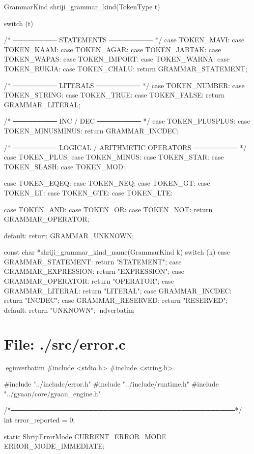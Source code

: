 \documentclass{article}
\begin{document}
GrammarKind shriji_grammar_kind(TokenType t)
{
    switch (t) {

        /* ───────── STATEMENTS ───────── */
        case TOKEN_MAVI:
        case TOKEN_KAAM:
        case TOKEN_AGAR:
        case TOKEN_JABTAK:
        case TOKEN_WAPAS:
        case TOKEN_IMPORT:
        case TOKEN_WARNA:
        case TOKEN_RUKJA:
        case TOKEN_CHALU:
            return GRAMMAR_STATEMENT;

        /* ───────── LITERALS ───────── */
        case TOKEN_NUMBER:
        case TOKEN_STRING:
        case TOKEN_TRUE:
        case TOKEN_FALSE:
            return GRAMMAR_LITERAL;

        /* ───────── INC / DEC ───────── */
        case TOKEN_PLUSPLUS:
        case TOKEN_MINUSMINUS:
            return GRAMMAR_INCDEC;

        /* ───────── LOGICAL / ARITHMETIC OPERATORS ───────── */
        case TOKEN_PLUS:
        case TOKEN_MINUS:
        case TOKEN_STAR:
        case TOKEN_SLASH:
        case TOKEN_MOD:

        case TOKEN_EQEQ:
        case TOKEN_NEQ:
        case TOKEN_GT:
        case TOKEN_LT:
        case TOKEN_GTE:
        case TOKEN_LTE:

        case TOKEN_AND:
        case TOKEN_OR:
        case TOKEN_NOT:
            return GRAMMAR_OPERATOR;

        default:
            return GRAMMAR_UNKNOWN;
    }
}

const char *shriji_grammar_kind_name(GrammarKind k)
{
    switch (k) {
        case GRAMMAR_STATEMENT:  return "STATEMENT";
        case GRAMMAR_EXPRESSION: return "EXPRESSION";
        case GRAMMAR_OPERATOR:   return "OPERATOR";
        case GRAMMAR_LITERAL:    return "LITERAL";
        case GRAMMAR_INCDEC:     return "INCDEC";
        case GRAMMAR_RESERVED:   return "RESERVED";
        default:                 return "UNKNOWN";
    }
}
nd{verbatim}
\section*{File: ./src/error.c}
egin{verbatim}
#include <stdio.h>
#include <string.h>

#include "../include/error.h"
#include "../include/runtime.h"
#include "../gyaan/core/gyaan_engine.h"

/*──────────────────────────────────────────────*/
int error_reported = 0;

static ShrijiErrorMode CURRENT_ERROR_MODE = ERROR_MODE_IMMEDIATE;
\end{document}
